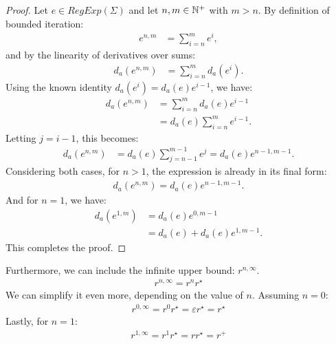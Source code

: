 \begin{proof}
	Let $e \in RegExp(\Sigma)$ and let $n, m \in {\mathbb{N}^{+}}$ with $m > n$. By definition of bounded iteration:
	\begin{align*}
		e^{n,m} &= \sum_{i=n}^{m} e^i,
	\end{align*}
	and by the linearity of derivatives over sums:
	\begin{align*}
		d_a(e^{n,m}) &= \sum_{i=n}^{m} d_a(e^i).
	\end{align*}
	Using the known identity $d_a(e^i) = d_a(e) e^{i-1}$, we have:
	\begin{align*}
		d_a(e^{n,m}) &= \sum_{i=n}^{m} d_a(e) e^{i-1} \\
		&= d_a(e) \sum_{i=n}^{m} e^{i-1}.
	\end{align*}
	Letting $j = i - 1$, this becomes:
	\begin{align*}
		d_a(e^{n,m}) &= d_a(e) \sum_{j=n-1}^{m-1} e^j = d_a(e) e^{n-1,m-1}.
	\end{align*}
	Considering both cases, for $n > 1$, the expression is already in its final form:
	\begin{align*}
		d_a(e^{n,m}) = d_a(e) e^{n-1,m-1}.
	\end{align*}
	And for $n = 1$, we have:
	\begin{align*}
		d_a(e^{1,m}) &= d_a(e) e^{0,m-1} \\
		&= d_a(e) + d_a(e) e^{1,m-1}.
	\end{align*}
	This completes the proof.
\end{proof}
Furthermore, we can include the infinite upper bound: $r^{n,\infty}$.
\begin{align*}
	r^{n,\infty} = r^nr^\star
\end{align*}
We can simplify it even more, depending on the value of $n$. Assuming $n=0$:
\begin{align*}
	r^{0,\infty} = r^0r^\star = \varepsilon r^\star =  r^\star
\end{align*}
Lastly, for $n=1$:
\begin{align*}
	r^{1,\infty} = r^1r^\star = rr^\star =  r^+
\end{align*}


